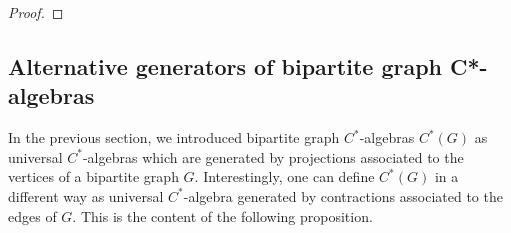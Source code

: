 \documentclass[a4paper]{amsart}
\newcommand{\Ha}{\mathrm{H}}
\begin{document}
\begin{proof}
\end{proof}

\subsection{Alternative generators of bipartite graph C*-algebras}

In the previous section, we introduced bipartite graph $C^\ast$-algebras $C^\ast(G)$ as universal $C^\ast$-algebras which are generated by projections associated to the vertices of a bipartite graph $G$. Interestingly, one can define $C^\ast(G)$ in a different way as universal $C^\ast$-algebra generated by contractions associated to the edges of $G$. This is the content of the following proposition.
\end{document}
